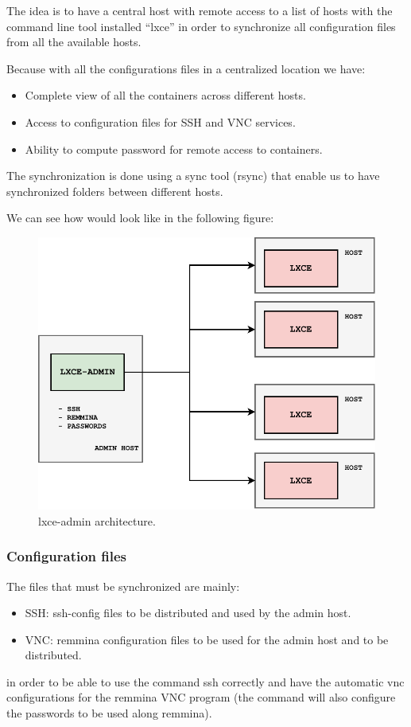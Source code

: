 The idea is to have a central host with remote access to a list of hosts with the command line tool installed ``lxce'' in order to synchronize all configuration files from all the available hosts. 

Because with all the configurations files in a centralized location we have:
\begin{itemize}
	\item{Complete view of all the containers across different hosts.}
	\item{Access to configuration files for SSH and VNC services.}
	\item{Ability to compute password for remote access to containers.}
\end{itemize}

The synchronization is done using a sync tool (rsync\cite{rsync}) that enable us to have synchronized folders between different hosts.

We can see how would look like in the following figure:
\begin{figure}[H]
	\label{fig:lxce-admin architecture}
	\centering
	\includegraphics{img/03/lxce-admin-diagram.pdf}
	\caption[lxce-admin architecture]{\footnotesize{lxce-admin architecture.}}
\end{figure}


\subsubsection{Configuration files}
The files that must be synchronized are mainly:
\begin{itemize}
	\item{SSH: ssh-config files to be distributed and used by the admin host.}
	\item{VNC: remmina configuration files to be used for the admin host and to be distributed.}
\end{itemize}
in order to be able to use the command ssh correctly and have the automatic vnc configurations for the remmina VNC program (the command will also configure the passwords to be used along remmina).



